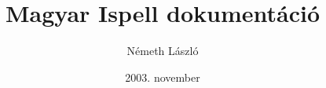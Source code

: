 \documentclass[12pt, hungarian, a4paper, oneside]{book}
\begin{document}

\pagestyle{fancy}
\rhead{}
\renewcommand{\headrulewidth}{0.4dd}
\lfoot{}
\rfoot{}
\cfoot{\thepage}
\renewcommand{\footrulewidth}{0.4dd}

\title{Magyar Ispell dokumentáció}
\author{Németh László}
\date{2003. november}
\maketitle

\thispagestyle{fancy}
\tableofcontents
\thispagestyle{fancy}
\newpage

\parskip=6dd
\sloppy









\nocite{szotar1999}
\nocite{idegen}
\nocite{mhsz1994}
\nocite{magy}
\nocite{smny2}
\nocite{smny3}
\nocite{manispell}
\nocite{papp}
\nocite{jakab}


\end{document}
